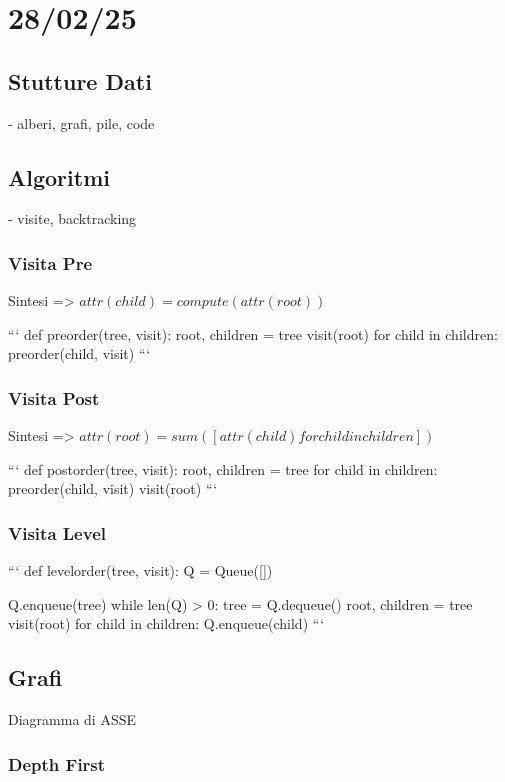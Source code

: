 \chapter{28/02/25}

\section{Stutture Dati}

- alberi, grafi, pile, code

\section{Algoritmi}

- visite, backtracking

\subsection{Visita Pre}

Sintesi => $attr(child) = compute(attr(root))$

```
def preorder(tree, visit):
  root, children = tree
  visit(root)
  for child in children:
    preorder(child, visit)
```

\subsection{Visita Post}

Sintesi => $attr(root) = sum([attr(child) for child in children])$

```
def postorder(tree, visit):
  root, children = tree
  for child in children:
    preorder(child, visit)
  visit(root)
```

\subsection{Visita Level}

```
def levelorder(tree, visit):
  Q = Queue([])

  Q.enqueue(tree)
  while len(Q) > 0:
    tree = Q.dequeue()
    root, children = tree
    visit(root)
    for child in children:
      Q.enqueue(child)
```

\section{Grafi}

Diagramma di ASSE

\subsection{Depth First}

